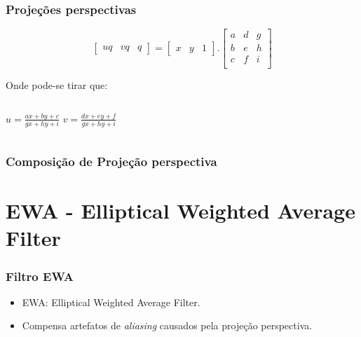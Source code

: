 \documentclass{beamer}
\begin{document}
\begin{frame}
\frametitle{Projeções perspectivas}

\[
 \begin{bmatrix}
      uq & vq & q
  \end{bmatrix} 
  = 
  \begin{bmatrix} x & y & 1 \end{bmatrix} . 
\begin{bmatrix} 
a & d & g \\
b & e & h \\
c & f & i \\  
\end{bmatrix}
\]

Onde pode-se tirar que: \\
\begin{columns}[c]
\column{2.0in}
$u = \frac{ax + by + c}{gx + hy + i}$
\column{2.0in}
$v = \frac{dx + ey + f}{gx + hy + i}$
\end{columns}
\end{frame}

\begin{frame}
\frametitle{Composição de Projeção perspectiva}
\begin{center}
\end{center}
\end{frame}

\section{EWA - Elliptical Weighted Average Filter}
\begin{frame}
\frametitle{Filtro EWA}
 \begin{itemize}
  \item EWA: Elliptical Weighted Average Filter.
  \item Compensa artefatos de \textit{aliasing} causados pela projeção
perspectiva.
 \end{itemize}
\end{frame}
\end{document}
